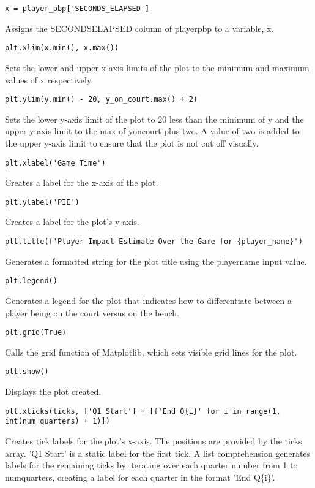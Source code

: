 \documentclass{article}
\begin{document}
\begin{lstlisting}
x = player_pbp['SECONDS_ELAPSED']
\end{lstlisting}
Assigns the SECONDS\textunderscore ELAPSED column of player\textunderscore pbp to a variable, x.
\begin{lstlisting}
plt.xlim(x.min(), x.max())
\end{lstlisting}
Sets the lower and upper x-axis limits of the plot to the minimum and maximum values of x respectively.
\begin{lstlisting}
plt.ylim(y.min() - 20, y_on_court.max() + 2)
\end{lstlisting}
Sets the lower y-axis limit of the plot to 20 less than the minimum of y and the upper y-axis limit to the max of y\textunderscore on\textunderscore court plus two. A value of two is added to the upper y-axis limit to ensure that the plot is not cut off visually.
\begin{lstlisting}
plt.xlabel('Game Time')
\end{lstlisting}
Creates a label for the x-axis of the plot.
\begin{lstlisting}
plt.ylabel('PIE')
\end{lstlisting}
Creates a label for the plot's y-axis.
\begin{lstlisting}
plt.title(f'Player Impact Estimate Over the Game for {player_name}')
\end{lstlisting}
Generates a formatted string for the plot title using the player\textunderscore name input value.
\begin{lstlisting}
plt.legend()
\end{lstlisting}
Generates a legend for the plot that indicates how to differentiate between a player being on the court versus on the bench.
\begin{lstlisting}
plt.grid(True)
\end{lstlisting}
Calls the grid function of Matplotlib, which sets visible grid lines for the plot.
\begin{lstlisting}
plt.show()
\end{lstlisting}
Displays the plot created.
\begin{lstlisting}
plt.xticks(ticks, ['Q1 Start'] + [f'End Q{i}' for i in range(1, int(num_quarters) + 1)])
\end{lstlisting}
Creates tick labels for the plot's x-axis. The positions are provided by the ticks array. 'Q1 Start' is a static label for the first tick. A list comprehension generates labels for the remaining ticks by iterating over each quarter number from 1 to num\textunderscore quarters, creating a label for each quarter in the format 'End Q\{i\}'.
\end{document}
